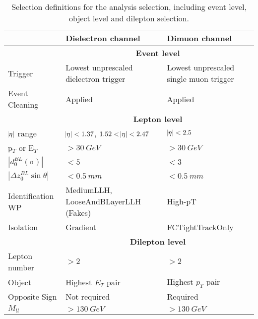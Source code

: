 \begin{table}[h]
    \centering
    {\begin{tabular}{l|p{5cm}|p{5cm}}
        & \textbf{Dielectron channel} & \textbf{Dimuon channel} \\
        \hline
        & \multicolumn{2}{c}{\textbf{Event level}} \\
        \hline
        Trigger & Lowest unprescaled \newline dielectron trigger & Lowest unprescaled \newline single muon trigger \\
        \hline
        Event Cleaning & Applied & Applied \\
        \hline
        & \multicolumn{2}{c}{\textbf{Lepton level}} \\
        \hline
        $\abs{\eta}$ range & $\abs{\eta} < 1.37$, $1.52 < \abs{\eta} < 2.47$ & $\abs{\eta} < 2.5$\\
        \hline
        p$_T$ or E$_T$ & $> 30~GeV$ &  $> 30~GeV$ \\
        \hline
        $|d_{0}^{BL}(\sigma)|$ & $< 5$  & $< 3$\\ 
        \hline
        $|\Delta z_{0}^{BL} \sin{\theta}|$ & $< 0.5~mm$ & $< 0.5~mm$ \\
        \hline
        Identification WP & MediumLLH, \newline LooseAndBLayerLLH (Fakes) & High-pT \\
        \hline
        Isolation & Gradient & FCTightTrackOnly \\
        \hline
        & \multicolumn{2}{c}{\textbf{Dilepton level}} \\
        \hline
        Lepton number & $>2$ & $>2$  \\
        \hline
        Object & Highest $E_T$ pair & Highest $p_T$ pair \\
        \hline
        Opposite Sign & Not required & Required \\
        \hline
        $M_{ll}$ & $> 130~GeV$ & $> 130~GeV$ \\

	\end{tabular}}
    \caption[Selection definitions for the analysis selection]{Selection definitions for the analysis selection, including event level, object level and dilepton selection.}
    \label{tab:sel}
  \end{table}

  \clearpage